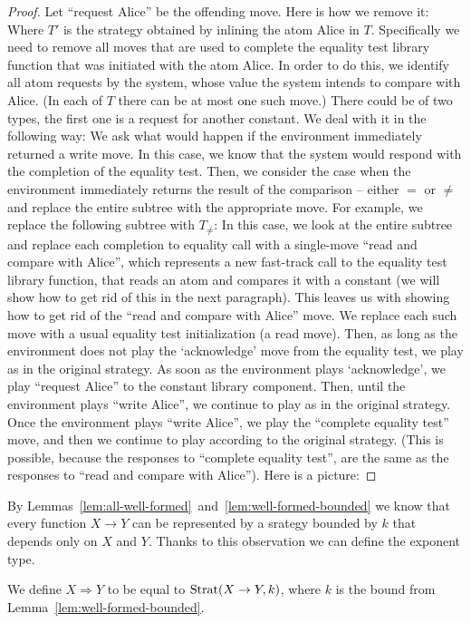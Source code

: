 \begin{proof}
    Let ``request Alice'' be the offending move. Here is how we remove it:
    Where $T'$ is the strategy obtained by inlining the atom Alice in $T$. 
    Specifically we need to remove all moves that are used to complete the 
    equality test library function that was initiated with the atom Alice.
    In order to do this, we identify all atom requests by the system, 
    whose value the system intends to compare with Alice.
    (In each of $T$ there can be at most one such move.)
    There could be of two types, the first one is a request for another 
    constant. We deal with it in the following way:
    We ask what would happen if the environment immediately returned a write move. 
    In this case, we know that the system would respond with the completion of the equality test. 
    Then, we consider the case when the environment immediately returns the result of the comparison -- 
    either $=$ or $\neq$ and replace the entire subtree with the appropriate move. 
    For example, we replace the following subtree with $T_{\neq}$:
    In this case, we look at the entire subtree and replace each completion to equality call 
    with a single-move ``read and compare with Alice'', which represents a new fast-track 
    call to the equality test library function, that reads an atom and compares it with a constant
    (we will show how to get rid of this in the next paragraph).
    This leaves us with showing how to get rid of the ``read and compare with Alice'' move. 
    We replace each such move with a usual equality test initialization (a read move). 
    Then, as long as the environment does not play the `acknowledge' move from the equality test, 
    we play as in the original strategy. As soon as the environment plays `acknowledge', 
    we play ``request Alice'' to the constant library component. Then, until the environment 
    plays ``write Alice'', we continue to play as in the original strategy. Once the environment
    plays ``write Alice'', we play the ``complete equality test'' move, and then we continue 
    to play according to the original strategy. (This is possible, because the responses 
    to ``complete equality test'', are the same as the responses to ``read and compare with Alice''). 
    Here is a picture:
\end{proof}
By Lemmas~\ref{lem:all-well-formed}~and~\ref{lem:well-formed-bounded} we know that every function $X \to Y$ 
can be represented by a srategy bounded by $k$ that depends only on $X$ and $Y$. Thanks to this observation 
we can define the exponent type. 
\begin{definition}
    We define $X \Rightarrow Y$ to be equal to $\text{Strat}(X \to Y, k)$, where $k$ is the bound from Lemma~\ref{lem:well-formed-bounded}.
\end{definition}

